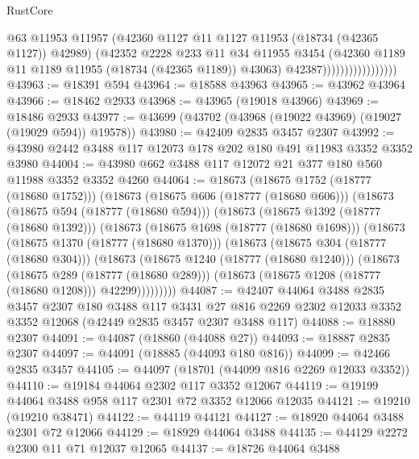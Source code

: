 \begin{lexlean}{RustCore}
\begin{coremodule}
                                    @63
                                    @11953
                                    @11957
                                    (@42360 @1127 @11 @1127 @11953 (@18734 (@42365 @1127)) @42989)
                                    (@42352
                                      @2228
                                      @233
                                      @11
                                      @34
                                      @11955
                                      @3454
                                      (@42360 @1189 @11 @1189 @11955 (@18734 (@42365 @1189)) @43063)
                                      @42387)))))))))))))))))
@43963 := @18391 @594
@43964 := @18588 @43963
@43965 := @43962 @43964
@43966 := @18462 @2933
@43968 := @43965 (@19018 @43966)
@43969 := @18486 @2933
@43977 := @43699 (@43702 (@43968 (@19022 @43969) (@19027 (@19029 @594)) @19578))
@43980 := @42409 @2835 @3457 @2307
@43992 := @43980 @2442 @3488 @117 @12073 @178 @202 @180 @491 @11983 @3352 @3352 @3980
@44004 := @43980 @662 @3488 @117 @12072 @21 @377 @180 @560 @11988 @3352 @3352 @4260
@44064 := @18673
    (@18675 @1752 (@18777 (@18680 @1752)))
    (@18673
      (@18675 @606 (@18777 (@18680 @606)))
      (@18673
        (@18675 @594 (@18777 (@18680 @594)))
        (@18673
          (@18675 @1392 (@18777 (@18680 @1392)))
          (@18673
            (@18675 @1698 (@18777 (@18680 @1698)))
            (@18673
              (@18675 @1370 (@18777 (@18680 @1370)))
              (@18673
                (@18675 @304 (@18777 (@18680 @304)))
                (@18673
                  (@18675 @1240 (@18777 (@18680 @1240)))
                  (@18673
                    (@18675 @289 (@18777 (@18680 @289)))
                    (@18673 (@18675 @1208 (@18777 (@18680 @1208))) @42299)))))))))
@44087 := @42407
    @44064
    @3488
    @2835
    @3457
    @2307
    @180
    @3488
    @117
    @3431
    @27
    @816
    @2269
    @2302
    @12033
    @3352
    @3352
    @12068
    (@42449 @2835 @3457 @2307 @3488 @117)
@44088 := @18880 @2307
@44091 := @44087 (@18860 (@44088 @27))
@44093 := @18887 @2835 @2307
@44097 := @44091 (@18885 (@44093 @180 @816))
@44099 := @42466 @2835 @3457
@44105 := @44097 (@18701 (@44099 @816 @2269 @12033 @3352))
@44110 := @19184 @44064 @2302 @117 @3352 @12067
@44119 := @19199 @44064 @3488 @958 @117 @2301 @72 @3352 @12066 @12035
@44121 := @19210 (@19210 @38471)
@44122 := @44119 @44121
@44127 := @18920 @44064 @3488 @2301 @72 @12066
@44129 := @18929 @44064 @3488
@44135 := @44129 @2272 @2300 @11 @71 @12037 @12065
@44137 := @18726 @44064 @3488

\end{coremodule}
\end{lexlean}
